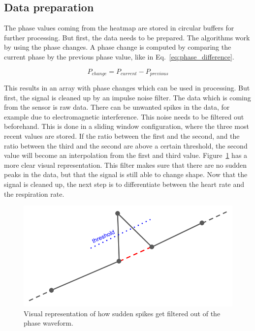 
\subsection{Data preparation}
The phase values coming from the heatmap are stored in circular buffers for further processing. But first, the data needs to be prepared. The algorithms work by using the phase changes. A phase change is computed by comparing the current phase by the previous phase value, like in Eq.~\ref{eq:phase_difference}.

\begin{equation}
    \label{eq:phase_difference}
    P_{change} = P_{current} - P_{previous}
\end{equation}

This results in an array with phase changes which can be used in processing. But first, the signal is cleaned up by an impulse noise filter. The data which is coming from the sensor is raw data. There can be unwanted spikes in the data, for example due to electromagnetic interference. This noise needs to be filtered out beforehand. This is done in a sliding window configuration, where the three most recent values are stored. If the ratio between the first and the second, and the ratio between the third and the second are above a certain threshold, the second value will become an interpolation from the first and third value. Figure~\ref{fig:phase_spike_filter} has a more clear visual representation. This filter makes sure that there are no sudden peaks in the data, but that the signal is still able to change shape. Now that the signal is cleaned up, the next step is to differentiate between the heart rate and the respiration rate.

\begin{figure}[t]
\centering
\includegraphics[width=.7\textwidth]{figures/measuring_vital_signs/threshold_interpolation.png}
\caption{Visual representation of how sudden spikes get filtered out of the phase waveform.}
\label{fig:phase_spike_filter}
\end{figure}

